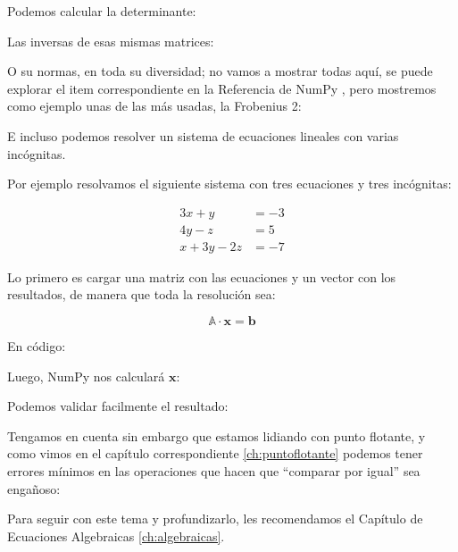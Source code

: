 Podemos calcular la determinante:


Las inversas de esas mismas matrices:


O su normas, en toda su diversidad; no vamos a mostrar todas aquí, se puede explorar el item correspondiente en la Referencia de NumPy \cite{numpy-normas}, pero mostremos como ejemplo unas de las más usadas, la Frobenius 2:


E incluso podemos resolver un sistema de ecuaciones lineales con varias incógnitas. 

Por ejemplo resolvamos el siguiente sistema con tres ecuaciones y tres incógnitas:

\begin{align*}
    3x+y &= -3 \\
    4y-z &= 5 \\
    x+3y-2z &= -7
\end{align*}

Lo primero es cargar una matriz con las ecuaciones y un vector con los resultados, de manera que toda la resolución sea:

\begin{equation*}
    \mathbb{A} \cdot \bm{x} = \bm{b}
\end{equation*} 

En código:


Luego, NumPy nos calculará $\bm{x}$:


Podemos validar facilmente el resultado:


Tengamos en cuenta sin embargo que estamos lidiando con punto flotante, y como vimos en el capítulo correspondiente \ref{ch:puntoflotante} podemos tener errores mínimos en las operaciones que hacen que ``comparar por igual'' sea engañoso:


Para seguir con este tema y profundizarlo, les recomendamos el Capítulo de Ecuaciones Algebraicas \ref{ch:algebraicas}.
